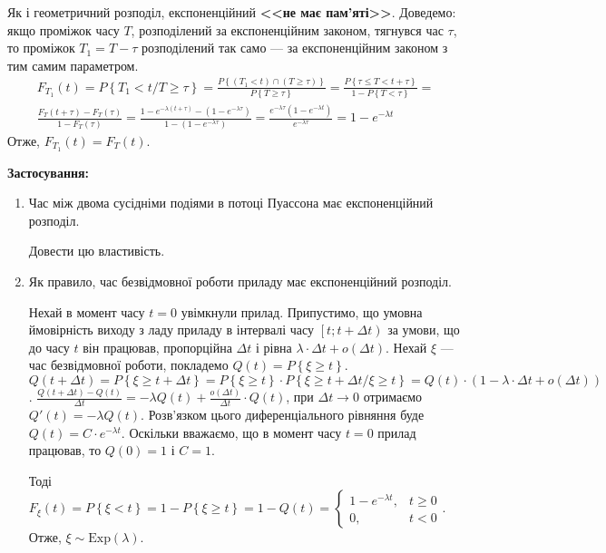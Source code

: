 Як і геометричний розподіл, експоненційний \textbf{<<не має пам'яті>>}.
Доведемо: якщо проміжок часу $T$, розподілений за експоненційним законом,
тягнувся час $\tau$, то проміжок $T_1 = T - \tau$ розподілений так само --- 
за експоненційним законом з тим самим параметром.
\begin{gather*}
    F_{T_1}(t) = P\left\{T_1 < t / T \geq \tau\right\} = 
    \frac{P\left\{(T_1 < t) \cap (T \geq \tau)\right\}}{P\left\{ T \geq \tau \right\}} =
    \frac{P{\left\{\tau \leq T < t +\tau\right\}}}{1 - P\left\{ T < \tau \right\}} = \\
    \frac{F_T(t+\tau) - F_T(\tau)}{1-F_T(\tau)} = 
    \frac{1-e^{-\lambda (t+\tau)} - (1 - e^{-\lambda \tau})}{1-(1-e^{-\lambda \tau})} =
    \frac{e^{-\lambda \tau}(1-e^{-\lambda t})}{e^{-\lambda \tau}} = 1-e^{-\lambda t}
\end{gather*}
Отже, $F_{T_1}(t) = F_T(t)$.

\noindent\textbf{Застосування:}
\begin{enumerate}
    \item Час між двома сусідніми подіями в потоці Пуассона має експоненційний розподіл.
    \begin{exercise}
        Довести цю властивість.
    \end{exercise}
    \item Як правило, час безвідмовної роботи приладу має експоненційний розподіл.
    
    Нехай в момент часу $t=0$ увімкнули прилад. Припустимо, що умовна ймовірність виходу з ладу
    приладу в інтервалі часу $\left[ t; t+\Delta t\right)$ за умови, що до часу $t$ він працював,
    пропорційна $\Delta t$ і рівна $\lambda\cdot \Delta t + o(\Delta t)$. Нехай $\xi$ --- час безвідмовної роботи,
    покладемо $Q(t) = P\left\{\xi \geq t\right\}$.
    $Q(t+\Delta t) = P\left\{\xi \geq t + \Delta t\right\} = P\left\{\xi \geq t\right\} \cdot P\left\{\xi \geq t+\Delta t / \xi \geq t\right\} = 
    Q(t) \cdot (1 - \lambda\cdot \Delta t + o(\Delta t))$.
    $\frac{Q(t+\Delta t) - Q(t)}{\Delta t} = -\lambda Q(t) + \frac{o(\Delta t)}{\Delta t} \cdot Q(t)$,
    при $\Delta t \rightarrow 0$ отримаємо $Q'(t) = -\lambda Q(t)$.
    Розв'язком цього диференціального рівняння буде $Q(t) = C\cdot e^{-\lambda t}$.
    Оскільки вважаємо, що в момент часу $t=0$ прилад працював, то $Q(0) = 1$ і $C=1$.

    Тоді $F_\xi(t) = P\left\{ \xi < t\right\} = 1 - P\left\{ \xi \geq t\right\} = 1 - Q(t) = \begin{cases}
        1 - e^{-\lambda t}, & t \geq 0 \\
        0, & t < 0
    \end{cases}$. Отже, $\xi \sim \mathrm{Exp}(\lambda)$.
\end{enumerate}


